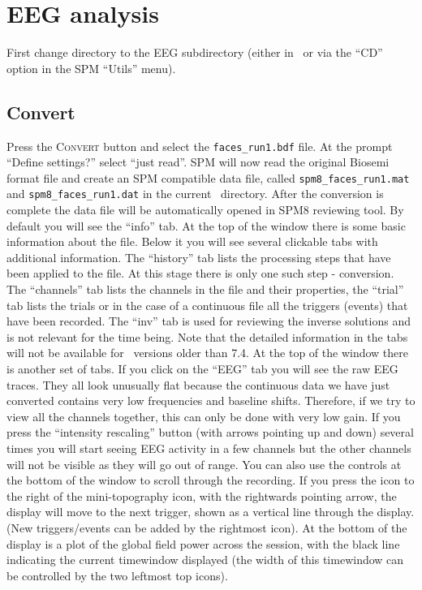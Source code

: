 \section{EEG analysis \label{multimodal:data:eeg}}

First change directory to the EEG subdirectory (either in \matlab\, or via the ``CD'' option in the SPM ``Utils'' menu).

\subsection{Convert}

Press the \textsc{Convert} button and select the \texttt{faces\_run1.bdf} file. At the prompt ``Define settings?'' select ``just read''.
SPM will now read the original Biosemi format file and create an SPM compatible data file, called \texttt{spm8\_faces\_run1.mat} and \texttt{spm8\_faces\_run1.dat} in the current \matlab\ directory. After the conversion is complete the data file will be automatically opened in SPM8 reviewing tool. By default you will see the ``info'' tab. At the top of the window there is some basic information about the file. Below it you will see several clickable tabs with additional information. The ``history'' tab lists the processing steps that have been applied to the file. At this stage there is only one such step - conversion. The ``channels'' tab lists the channels in the file and their properties, the ``trial'' tab lists the trials or in the case of a continuous file all the triggers (events) that have been recorded. The ``inv'' tab is used for reviewing the inverse solutions and is not relevant for the time being. Note that the detailed information in the tabs will not be available for \matlab\ versions older than 7.4.  At the top of the window there is another set of tabs. If you click on the ``EEG'' tab you will see the raw EEG traces. They all look unusually flat because the continuous data we have just converted contains very low frequencies and baseline shifts. Therefore, if we try to view all the channels together, this can only be done with very low gain.
If you press the ``intensity rescaling'' button (with arrows pointing up and down) several times you will start seeing EEG activity in a few channels but the other channels will not be visible as they will go out of range. You can also use the controls at the bottom of the window to scroll through the recording. If you press the icon to the right of the mini-topography icon, with the rightwards pointing arrow, the display will move to the next trigger, shown as a vertical line through the display. (New triggers/events can be added by the rightmost icon). At the bottom of the display is a plot of the global field power across the session, with the black line indicating the current timewindow displayed (the width of this timewindow can be controlled by the two leftmost top icons).


